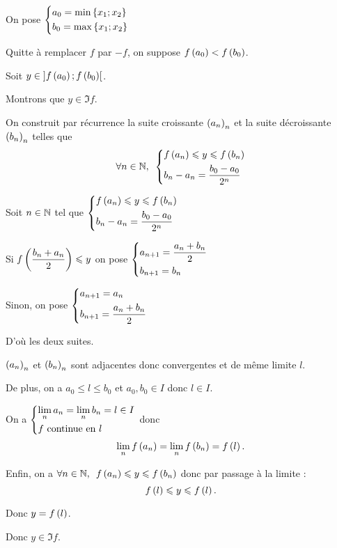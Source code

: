 \begin{dem}~\\
On pose \(\begin{dcases}a_0=\min\left\lbrace x_1;x_2\right\rbrace \\ b_0=\max\left\lbrace x_1;x_2\right\rbrace\end{dcases}\)

Quitte à remplacer \(f\) par \(-f\), on suppose \(f\left(a_0\right)<f\left(b_0\right)\).

Soit \(y\in\left]f\left(a_0\right);f\left(b_0\right)\right[\).

Montrons que \(y\in\Im f\).

On construit par récurrence la suite croissante \(\left(a_n\right)_n\) et la suite décroissante \(\left(b_n\right)_n\) telles que \[\quantifs{\forall n\in\N}\begin{dcases}f\paren{a_n}\leq y\leq f\paren{b_n} \\ b_n-a_n=\dfrac{b_0-a_0}{2^n}\end{dcases}\]

Soit \(n\in\mathbb{N}\) tel que \(\begin{dcases}f\left(a_n\right)\leqslant y\leqslant f\left(b_n\right) \\ b_n-a_n=\dfrac{b_0-a_0}{2^n}\end{dcases}\)

Si \(f\left(\dfrac{b_n+a_n}{2}\right)\leqslant y\) on pose \(\begin{dcases}a_{n+1}=\dfrac{a_n+b_n}{2} \\ b_{n+1}=b_n\end{dcases}\)

Sinon, on pose \(\begin{dcases}a_{n+1}=a_n \\ b_{n+1}=\dfrac{a_n+b_n}{2}\end{dcases}\)

D'où les deux suites.

\(\left(a_n\right)_n\) et \(\left(b_n\right)_n\) sont adjacentes donc convergentes et de même limite \(l\).

De plus, on a \(a_0\leq l\leq b_0\) et \(a_0,b_0\in I\) donc \(l\in I\).

On a \(\begin{dcases}\lim_na_n=\lim_nb_n=l\in I \\ f\text{ continue en }l\end{dcases}\) donc \[\lim_nf\left(a_n\right)=\lim_nf\left(b_n\right)=f\left(l\right).\]

Enfin, on a \(\quantifs{\forall n\in\N}f\paren{a_n}\leq y\leq f\paren{b_n}\) donc par passage à la limite : \[f\left(l\right)\leqslant y\leqslant f\left(l\right).\]

Donc \(y=f\left(l\right)\).

Donc \(y\in\Im f\).
\end{dem}

